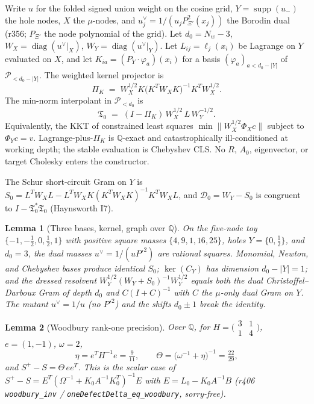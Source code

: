 \documentclass[11pt]{article}
\newtheorem{lemma}{Lemma}
\theoremstyle{remark}
\newcommand{\half}{\tfrac12}
\newcommand{\Tfrak}{\mathfrak{T}}
\newcommand{\cD}{\mathcal{D}}
\begin{document}
Write $u$ for the folded signed union weight on the cosine
grid, $Y=\operatorname{supp}(u_-)$ the hole nodes, $X$ the
$\mu$-nodes, and $u^\vee_j=1/(u_j P_{\Xi'}^2(x_j))$ the
Borodin dual (r356; $P_{\Xi'}$ the node polynomial of the
grid).
Let $d_0=N_w-3$, $W_X=\operatorname{diag}(u^\vee|_X)$,
$W_Y=\operatorname{diag}(u^\vee|_Y)$.
Let $L_{ij}=\ell_j(x_i)$ be Lagrange on $Y$ evaluated on $X$,
and let $K_{ia}=(P_Y\cdot\varphi_a)(x_i)$ for a basis
$(\varphi_a)_{a<d_0-|Y|}$ of $\mathcal{P}_{<d_0-|Y|}$.
The weighted kernel projector is
\begin{equation}\label{eq:PiK}
  \Pi_K
  \;=\;
  W_X^{1/2}K\bigl(K^TW_XK\bigr)^{-1}K^TW_X^{1/2}.
\end{equation}
The min-norm interpolant in $\mathcal{P}_{<d_0}$ is
\begin{equation}\label{eq:T0}
  \Tfrak_0
  \;=\;
  (I-\Pi_K)\,W_X^{1/2}\,L\,W_Y^{-1/2}.
\end{equation}
Equivalently, the KKT of constrained least squares
$\min\|W_X^{1/2}\Phi_X c\|$ subject to $\Phi_Y c=v$.
Lagrange-plus-$\Pi_K$ is $\mathbb{Q}$-exact and catastrophically
ill-conditioned at working depth; the stable evaluation is
Chebyshev CLS.
No $R$, $A_0$, eigenvector, or target Cholesky enters the
constructor.

The Schur short-circuit Gram on $Y$ is
$S_0=L^TW_XL-L^TW_XK(K^TW_XK)^{-1}K^TW_XL$, and
$\cD_0=W_Y-S_0$ is congruent to $I-\Tfrak_0^*\Tfrak_0$
(Haynsworth I7).

\begin{lemma}[Three bases, kernel, graph over $\mathbb{Q}$]
\label{lem:basis}
On the five-node toy $\{ -1,-\half,0,\half,1\}$ with
positive square masses $\{4,9,1,16,25\}$, holes
$Y=\{0,\half\}$, and $d_0=3$, the dual masses
$u^\vee=1/(u P'^2)$ are rational squares.
Monomial, Newton, and Chebyshev bases produce identical
$S_0$; $\ker(C_Y)$ has dimension $d_0-|Y|=1$; and the
dressed resolvent
$W_Y^{1/2}(W_Y+S_0)^{-1}W_Y^{1/2}$ equals both the dual
Christoffel--Darboux Gram of depth $d_0$ and
$C(I+C)^{-1}$ with $C$ the $\mu$-only dual Gram on $Y$.
The mutant $u^\vee=1/u$ (no $P'^2$) and the shifts
$d_0\pm 1$ break the identity.
\end{lemma}

\begin{lemma}[Woodbury rank-one precision]\label{lem:woodbury}
Over $\mathbb{Q}$, for $H=\bigl(\begin{smallmatrix}3&1\\1&4\end{smallmatrix}\bigr)$,
$e=(1,-1)$, $\omega=2$,
\[
  \eta=e^TH^{-1}e=\tfrac{9}{11},\qquad
  \Theta=\bigl(\omega^{-1}+\eta\bigr)^{-1}=\tfrac{22}{29},
\]
and $S^+-S=\Theta\,ee^T$.
This is the scalar case of
$S^+-S=E^T(\Omega^{-1}+K_0A^{-1}K_0^T)^{-1}E$
with $E=L_0-K_0A^{-1}B$ (r406 \texttt{woodbury\_inv} /
\texttt{oneDefectDelta\_eq\_woodbury}, sorry-free).
\end{lemma}
\end{document}
